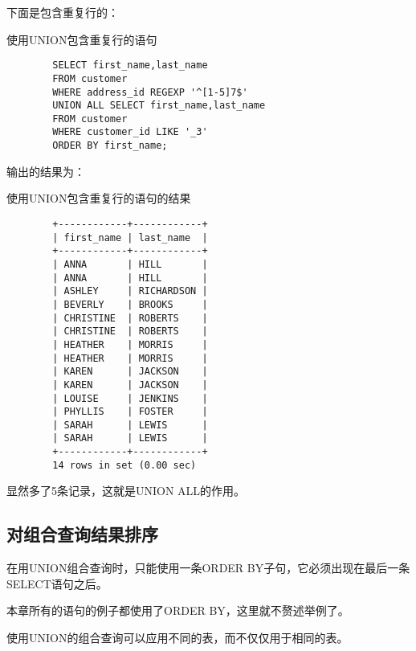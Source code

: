 \documentclass[UTF8]{article}
\begin{document}
下面是包含重复行的：

\begin{listing}[H]
        \caption{使用UNION包含重复行的语句}
	\label{code:useunionrepeatclause}
\begin{verbatim}
        SELECT first_name,last_name 
        FROM customer 
        WHERE address_id REGEXP '^[1-5]7$' 
        UNION ALL SELECT first_name,last_name 
        FROM customer 
        WHERE customer_id LIKE '_3' 
        ORDER BY first_name;
\end{verbatim}
\end{listing}

输出的结果为：

\begin{listing}[H]
	\caption{使用UNION包含重复行的语句的结果}
	\label{code:useunionrepeatclauseresult}
\begin{verbatim}
        +------------+------------+
        | first_name | last_name  |
        +------------+------------+
        | ANNA       | HILL       |
        | ANNA       | HILL       |
        | ASHLEY     | RICHARDSON |
        | BEVERLY    | BROOKS     |
        | CHRISTINE  | ROBERTS    |
        | CHRISTINE  | ROBERTS    |
        | HEATHER    | MORRIS     |
        | HEATHER    | MORRIS     |
        | KAREN      | JACKSON    |
        | KAREN      | JACKSON    |
        | LOUISE     | JENKINS    |
        | PHYLLIS    | FOSTER     |
        | SARAH      | LEWIS      |
        | SARAH      | LEWIS      |
        +------------+------------+
        14 rows in set (0.00 sec)
\end{verbatim}
\end{listing}

显然多了5条记录，这就是UNION ALL的作用。

\subsection{对组合查询结果排序}

\begin{orangebox}[frametitle={Tips 17.4.1 组合查询结果排序注意事项}]
        在用UNION组合查询时，只能使用一条ORDER BY子句，它必须出现在最后一条SELECT语句之后。
\end{orangebox}

本章所有的语句的例子都使用了ORDER BY，这里就不赘述举例了。

\begin{orangebox}[frametitle={Tips 17.4.2 组合不同的表}]
        使用UNION的组合查询可以应用不同的表，而不仅仅用于相同的表。
\end{orangebox}
\end{document}
